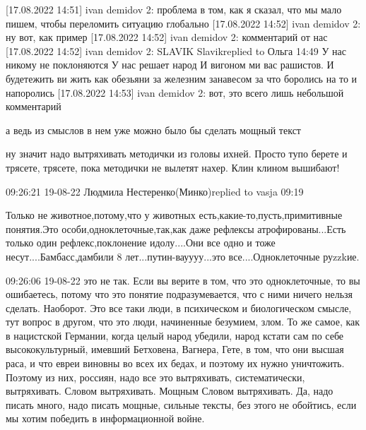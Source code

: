 [17.08.2022 14:51] ivan demidov 2: проблема в том, как я сказал, что мы мало пишем, чтобы переломить ситуацию глобально
[17.08.2022 14:52] ivan demidov 2: ну вот, как пример
[17.08.2022 14:52] ivan demidov 2: комментарий от нас
[17.08.2022 14:52] ivan demidov 2: SLAVIK Slavikreplied to Ольга
14:49
У нас никому не поклоняются
У нас решает народ И вигоном ми вас рашистов. И будетежить ви жить как обезьяни за железним занавесом за что боролись на то и напоролись
[17.08.2022 14:53] ivan demidov 2: вот, это всего лишь небольшой комментарий

а ведь из смыслов в нем уже можно было бы сделать мощный текст

ну значит надо вытряхивать методички из головы ихней. Просто тупо берете и
трясете, трясете, пока методички не вылетят нахер. Клин клином вышибают!


09:26:21 19-08-22
Людмила Нестеренко(Минко)replied to vasja
09:19

Только не животное,потому,что у животных есть,какие-то,пусть,примитивные
понятия.Это особи,одноклеточные,так,как даже рефлексы атрофированы...Есть
только один рефлекс,поклонение идолу....Они все одно и тоже
несут....Бамбасс,дамбили 8 лет...путин-вауууу...это все....Одноклеточные
руzzkие.

09:26:06 19-08-22
это не так. Если вы верите в том, что это одноклеточные, то вы ошибаетесь,
потому что это понятие подразумевается, что с ними ничего нельзя сделать.
Наоборот. Это все таки люди, в психическом и биологическом смысле, тут вопрос в
другом, что это люди, начиненные безумием, злом. То же самое, как в нацистской
Германии, когда целый народ убедили, народ кстати сам по себе высококультурный,
имевший Бетховена, Вагнера, Гете, в том, что они высшая раса, и что евреи
виновны во всех их бедах, и поэтому их нужно уничтожить. Поэтому из них,
россиян, надо все это вытряхивать, систематически, вытряхивать. Словом
вытряхивать. Мощным Словом вытряхивать. Да, надо писать много, надо писать
мощные, сильные тексты, без этого не обойтись, если мы хотим победить в
информационной войне.





